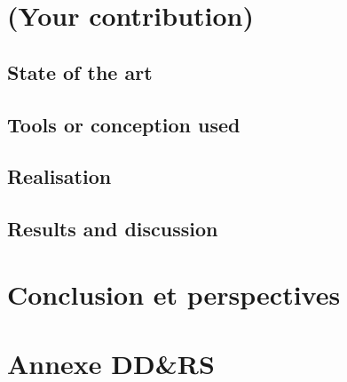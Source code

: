 \begin{sloppypar}
\newpage
\section{(Your contribution)}
\subsection{State of the art}

\subsection{Tools or conception used}

\subsection{Realisation}

\subsection{Results and discussion}









\newpage
\section{Conclusion et perspectives}
\label{conclusion}
\cite{perceptron}




\newpage

\printbibliography %


% 
% 




\newpage
\label{glossaire}

\glsaddallunused %
\printnoidxglossaries





\newpage
\appendix %

\section{Annexe DD\&RS}
\label{ddrs}


\end{sloppypar}
